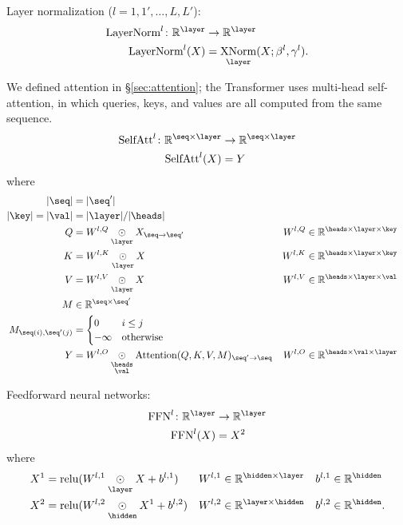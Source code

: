 \documentclass{article}
\newcommand{\reals}{\mathbb{R}}
\begin{document}
Layer normalization ($l = 1, 1', \ldots, L, L'$):
\begin{align*}
  \text{LayerNorm}^l \colon \mathbb{R}^{\layer} &\rightarrow \mathbb{R}^{\layer} \\
  \text{LayerNorm}^l(X) &= \nfun{\layer}{XNorm}(X; \beta^l, \gamma^l).
\end{align*}

We defined attention in \S\ref{sec:attention}; the Transformer uses multi-head self-attention, in which queries, keys, and values are all computed from the same sequence.
\begin{align*}
  \text{SelfAtt}^l \colon \mathbb{R}^{\seq \times \layer} &\rightarrow \mathbb{R}^{\seq \times \layer} \\
  \text{SelfAtt}^l(X) &= Y
\end{align*}
where
\begin{align*}
  |\seq| &= |\seq'| \\
  |\key| = |\val| &= |\layer|/|\heads| \\
  Q &= W^{l,Q} \ndot{\layer} X_{\seq\rightarrow\seq'} & W^{l,Q} &\in \mathbb{R}^{\heads \times \layer \times \key} \\
  K &= W^{l,K} \ndot{\layer} X & W^{l,K} &\in \mathbb{R}^{\heads \times \layer \times \key} \\
  V &= W^{l,V} \ndot{\layer} X & W^{l,V} &\in \mathbb{R}^{\heads \times \layer \times \val} \\
  M & \in \reals^{\seq \times \seq'} \\
  M_{\seq(i), \seq'(j)} &= \begin{cases}
    0 & i \leq j\\
    -\infty & \text{otherwise}
  \end{cases} \\
  Y &= W^{l,O} \ndot{\heads \\ \val} \text{Attention}(Q, K, V, M)_{\seq'\rightarrow\seq} & W^{l,O} &\in \mathbb{R}^{\heads \times \val \times \layer}
\end{align*}

Feedforward neural networks:
\begin{align*}
  \text{FFN}^l \colon \mathbb{R}^{\layer} &\rightarrow \mathbb{R}^{\layer} \\
  \text{FFN}^l(X) &= X^2
\end{align*}
where
\begin{align*}
  X^1 &= \text{relu}(W^{l,1} \ndot{\layer} X + b^{l,1}) & W^{l,1} &\in \mathbb{R}^{\hidden \times \layer} & b^{l,1} &\in \mathbb{R}^{\hidden} \\
  X^2 &= \text{relu}(W^{l,2} \ndot{\hidden} X^1 + b^{l,2}) & W^{l,2} &\in \mathbb{R}^{\layer \times \hidden} & b^{l,2} &\in \mathbb{R}^{\hidden}.
\end{align*}
\end{document}
